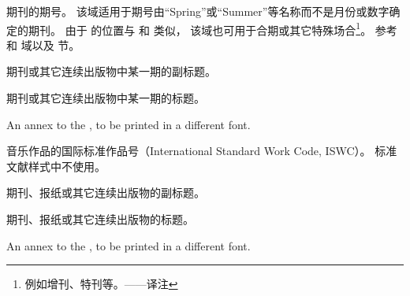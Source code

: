 \begin{fieldlist}

期刊的期号。
该域适用于期号由“Spring”或“Summer”等名称而不是月份或数字确定的期刊。
由于  的位置与  和  类似，
该域也可用于合期或其它特殊场合\footnote{例如增刊、特刊等。——译注}。
参考  和  域以及  节。




期刊或其它连续出版物中某一期的副标题。




期刊或其它连续出版物中某一期的标题。


An annex to the , to be printed in a different font.




音乐作品的国际标准作品号（International Standard Work Code,  ISWC）。
标准文献样式中不使用。




期刊、报纸或其它连续出版物的副标题。




期刊、报纸或其它连续出版物的标题。


An annex to the , to be printed in a different font.



\end{fieldlist}
